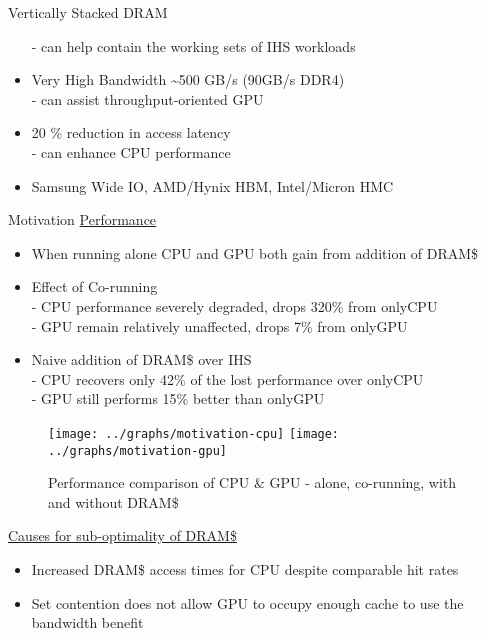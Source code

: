 \documentclass[final,t]{beamer}
\begin{document}
\begin{frame}[t,fragile]{}
\begin{columns}[t]
\begin{column}{.47\linewidth}
\begin{exampleblock}{Vertically Stacked DRAM}
\begin{itemize}
       				\qquad - can help contain the working sets of IHS workloads
    		\item Very High Bandwidth \textasciitilde 500 GB/s (90GB/s DDR4)\\
    				\qquad - can assist throughput-oriented GPU
    		\item 20 \% reduction in access latency \\
    				\qquad - can enhance CPU performance
        	\item Samsung Wide IO, AMD/Hynix HBM, Intel/Micron HMC
        \end{itemize}
    \end{exampleblock}
    \begin{exampleblock}{Motivation}
    \vspace{-0.2em}
    \centering 
    \underline{Performance}

    \begin{itemize}
       	\item When running alone CPU and GPU both gain from addition of DRAM\$
      	\item Effect of Co-running \\
      		\qquad - CPU performance severely degraded, drops 320\% from onlyCPU\\
      		\qquad - GPU remain relatively unaffected, drops 7\% from onlyGPU
      	\item Naive addition of DRAM\$ over IHS \\
      		\qquad - CPU recovers only 42\% of the lost performance over onlyCPU \\
      		\qquad - GPU still performs  15\% better than onlyGPU \\
    \end{itemize}
    \begin{figure}
       \texttt{[image: ../graphs/motivation-cpu]}
       \texttt{[image: ../graphs/motivation-gpu]}
       \caption{Performance comparison of CPU \& GPU - alone, co-running, with and without DRAM\$}
       \label{fig:motivation}
    \end{figure}
    
    \underline{Causes for sub-optimality of DRAM\$}
    \begin{itemize}
   		\item Increased DRAM\$ access times for CPU despite comparable hit rates
        \item Set contention does not allow GPU to occupy enough cache to use the bandwidth benefit
    \end{itemize}
    

\end{exampleblock}
\end{column}
\end{columns}
\end{frame}
\end{document}
